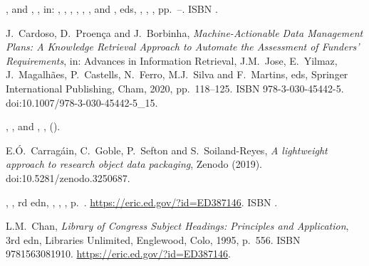 \documentclass[ds,v1.1.2,openaccess]{iosart2x}%
\begin{document}
\begin{thebibliography}{}
%
\begin{bchapter}
,
 and
,
,
in: ,
,
,
,
,
,
 and
, eds,
,
,
,
pp.~--.
ISBN .
\end{bchapter}
%
\OrigBibText
J.~Cardoso,
D.~Proen{\c{c}}a and
J.~Borbinha,
\textit{Machine-Actionable Data Management Plans: A Knowledge Retrieval
Approach to Automate the Assessment of Funders' Requirements},
in: Advances in Information Retrieval,
J.M.~Jose,
E.~Yilmaz,
J.~Magalh{\~a}es,
P.~Castells,
N.~Ferro,
M.J.~Silva and
F.~Martins, eds,
Springer International Publishing,
Cham,
2020,
pp.~118--125.
ISBN 978-3-030-45442-5.
doi:10.1007/978-3-030-45442-5\_15.
\endOrigBibText
{}
\endbibitem

%
\begin{barticle}
,
,
 and
,
,
().
\end{barticle}
%
\OrigBibText
E.{\'{O}}.~Carrag\'{a}in,
C.~Goble,
P.~Sefton and
S.~Soiland-Reyes,
\textit{A lightweight approach to research object data packaging},
Zenodo
(2019).
doi:10.5281/zenodo.3250687.
\endOrigBibText
{}
\endbibitem

%
\begin{bbook}
,
,
rd edn,
,
,
,
p.~.
\url{https://eric.ed.gov/?id=ED387146}.
ISBN .
\end{bbook}
%
\OrigBibText
L.M.~Chan,
\textit{Library of Congress Subject Headings: Principles and Application},
3rd edn,
Libraries Unlimited,
Englewood, Colo,
1995,
p.~556.
ISBN 9781563081910.
\url{https://eric.ed.gov/?id=ED387146}.
\endOrigBibText
{}
\endbibitem


\end{thebibliography}
\end{document}
